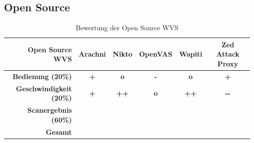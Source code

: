 \documentclass[12pt,oneside,a4paper,parskip]{scrbook}
\begin{document}
    \subsection{Open Source}
      \begin{table}[H]
        \centering
        \begin{tabular}{|r|c|c|c|c|c|}
        \hline
        \textbf{Open Source WVS}            & \textbf{Arachni} & \textbf{Nikto} & \textbf{OpenVAS} & \textbf{Wapiti} & \textbf{Zed Attack Proxy}  \\
        \hline
        \textbf{Bedienung (20\%)}       & \textbf{+}       & \textbf{o}     & \textbf{-}       & \textbf{o}      & \textbf{+}                 \\
        \hline
        \textbf{Geschwindigkeit (20\%)} & \textbf{+}       & \textbf{++}    & \textbf{o}       & \textbf{++}     & \textbf{-{}-}                \\
        \hline
        \textbf{Scanergebnis (60\%)}    &                  &                &                  &                 &                            \\
        \hline
        \textbf{Gesamt}                 &                  &                &                  &                 &                            \\
        \hline
        \end{tabular}
        \caption[Bewertung der Open Source WVS]{Bewertung der Open Source WVS}
      \end{table}
\end{document}
